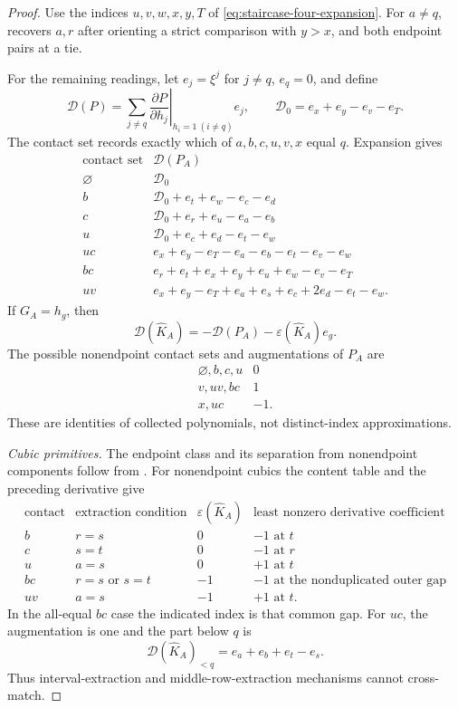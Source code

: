 \documentclass[11pt,a4paper]{amsart}
\numberwithin{equation}{section}
\theoremstyle{plain}
\theoremstyle{definition}
\begin{document}
\begin{proof}
Use the indices \(u,v,w,x,y,T\) of
\eqref{eq:staircase-four-expansion}.  For \(a\ne q\),
 recovers \(a,r\) after
orienting a strict comparison with \(y>x\), and both endpoint pairs
at a tie.

For the remaining readings, let \(e_j=\xi^j\) for \(j\ne q\),
\(e_q=0\), and define
\[
 \mathcal D(P)=\sum_{j\ne q}
 \left.\frac{\partial P}{\partial h_j}\right|_{h_i=1\ (i\ne q)}e_j,
 \qquad \mathcal D_0=e_x+e_y-e_v-e_T.
\]
The contact set records exactly which of \(a,b,c,u,v,x\) equal \(q\).
Expansion gives
\[
\begin{array}{c|l}
\text{contact set}&\mathcal D(P_A)\\\hline
\varnothing&\mathcal D_0\\
b&\mathcal D_0+e_t+e_w-e_c-e_d\\
c&\mathcal D_0+e_r+e_u-e_a-e_b\\
u&\mathcal D_0+e_c+e_d-e_t-e_w\\
uc&e_x+e_y-e_T-e_a-e_b-e_t-e_v-e_w\\
bc&e_r+e_t+e_x+e_y+e_u+e_w-e_v-e_T\\
uv&e_x+e_y-e_T+e_a+e_s+e_c+2e_d-e_t-e_w.
\end{array}
\]
If \(G_A=h_g\), then
\[
 \mathcal D(\widehat K_A)
 =-\mathcal D(P_A)-\varepsilon(\widehat K_A)e_g.
\]
The possible nonendpoint contact sets and augmentations of \(P_A\) are
\[
\begin{array}{c|c}
\varnothing,b,c,u&0\\ v,uv,bc&1\\ x,uc&-1.
\end{array}
\]
These are identities of collected polynomials, not distinct-index
approximations.

\emph{Cubic primitives.}
The endpoint class and its separation from nonendpoint components follow
from .  For nonendpoint cubics the
content table and the preceding derivative give
\[
\begin{array}{c|c|c|l}
\text{contact}&\text{extraction condition}&\varepsilon(\widehat K_A)
 &\text{least nonzero derivative coefficient}\\\hline
b&r=s&0&-1\text{ at }t\\
c&s=t&0&-1\text{ at }r\\
u&a=s&0&+1\text{ at }t\\
bc&r=s\text{ or }s=t&-1&-1\text{ at the nonduplicated outer gap}\\
uv&a=s&-1&+1\text{ at }t.
\end{array}
\]
In the all-equal \(bc\) case the indicated index is that common gap.
For \(uc\), the augmentation is one and the part below \(q\) is
\[
 \mathcal D(\widehat K_A)_{<q}=e_a+e_b+e_t-e_s.
\]
Thus interval-extraction and middle-row-extraction mechanisms cannot
cross-match.


\end{proof}
\end{document}

